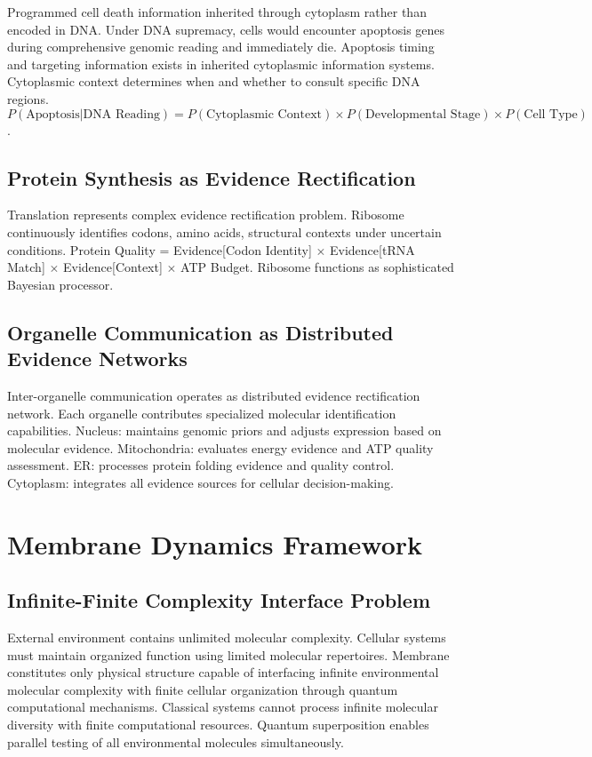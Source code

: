 \documentclass[12pt,a4paper]{article}
\begin{document}
Programmed cell death information inherited through cytoplasm rather than encoded in DNA. Under DNA supremacy, cells would encounter apoptosis genes during comprehensive genomic reading and immediately die. Apoptosis timing and targeting information exists in inherited cytoplasmic information systems. Cytoplasmic context determines when and whether to consult specific DNA regions. $P(\text{Apoptosis}|\text{DNA Reading}) = P(\text{Cytoplasmic Context}) \times P(\text{Developmental Stage}) \times P(\text{Cell Type})$.

\subsection{Protein Synthesis as Evidence Rectification}

Translation represents complex evidence rectification problem. Ribosome continuously identifies codons, amino acids, structural contexts under uncertain conditions. Protein Quality = Evidence[Codon Identity] $\times$ Evidence[tRNA Match] $\times$ Evidence[Context] $\times$ ATP Budget. Ribosome functions as sophisticated Bayesian processor.

\subsection{Organelle Communication as Distributed Evidence Networks}

Inter-organelle communication operates as distributed evidence rectification network. Each organelle contributes specialized molecular identification capabilities. Nucleus: maintains genomic priors and adjusts expression based on molecular evidence. Mitochondria: evaluates energy evidence and ATP quality assessment. ER: processes protein folding evidence and quality control. Cytoplasm: integrates all evidence sources for cellular decision-making.

\section{Membrane Dynamics Framework}

\subsection{Infinite-Finite Complexity Interface Problem}

External environment contains unlimited molecular complexity. Cellular systems must maintain organized function using limited molecular repertoires. Membrane constitutes only physical structure capable of interfacing infinite environmental molecular complexity with finite cellular organization through quantum computational mechanisms. Classical systems cannot process infinite molecular diversity with finite computational resources. Quantum superposition enables parallel testing of all environmental molecules simultaneously.
\end{document}
